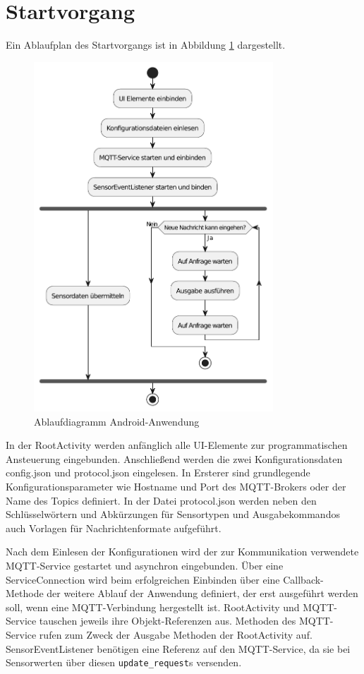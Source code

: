 \documentclass[11pt,a4paper]{report}
\begin{document}
\section{Startvorgang}
Ein Ablaufplan des Startvorgangs ist in Abbildung \ref{fig:app_flow} dargestellt.
\begin{figure}[htbp]
  \centering
  \includegraphics[width=0.8\textwidth]{images/app_ablauf}
  \caption{Ablaufdiagramm Android-Anwendung}
  \label{fig:app_flow}
\end{figure}
In der RootActivity werden anfänglich alle UI-Elemente zur programmatischen Ansteuerung eingebunden.
Anschließend werden die zwei Konfigurationsdaten config.json und protocol.json eingelesen.
In Ersterer sind grundlegende Konfigurationsparameter wie Hostname und Port des MQTT-Brokers oder der Name des Topics definiert.
In der Datei protocol.json werden neben den Schlüsselwörtern und Abkürzungen für Sensortypen und Ausgabekommandos auch Vorlagen für Nachrichtenformate aufgeführt.

Nach dem Einlesen der Konfigurationen wird der zur Kommunikation verwendete MQTT-Service gestartet und asynchron eingebunden.
Über eine ServiceConnection wird beim erfolgreichen Einbinden über eine Callback-Methode der weitere Ablauf der Anwendung definiert, der erst ausgeführt werden soll, wenn eine MQTT-Verbindung hergestellt ist.
RootActivity und MQTT-Service tauschen jeweils ihre Objekt-Referenzen aus.
Methoden des MQTT-Service rufen zum Zweck der Ausgabe Methoden der RootActivity auf.
SensorEventListener benötigen eine Referenz auf den MQTT-Service, da sie bei Sensorwerten über diesen \texttt{update\_request}s versenden.
\end{document}
